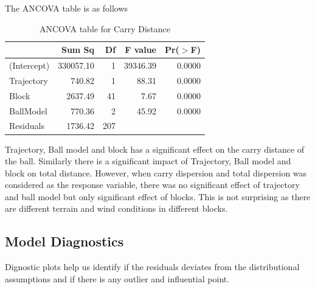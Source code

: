 \documentclass{article}\usepackage[]{graphicx}\usepackage[]{color}
\begin{document}
The ANCOVA table is as follows

\begin{table}[ht]
\centering
\begin{tabular}{|l|rrrr|}
  \hline
 & Sum Sq & Df & F value & Pr($>$F) \\ 
  \hline
(Intercept) & 330057.10 & 1 & 39346.39 & 0.0000 \\ 
  Trajectory & 740.82 & 1 & 88.31 & 0.0000 \\ 
  Block & 2637.49 & 41 & 7.67 & 0.0000 \\ 
  BallModel & 770.36 & 2 & 45.92 & 0.0000 \\ 
  Residuals & 1736.42 & 207 &  &  \\ 
   \hline
\end{tabular}
\caption{ANCOVA table for Carry Distance}
\end{table}

\bigskip

\bigskip

Trajectory, Ball model and block has a significant effect on the carry distance of the ball. Similarly there is a significant impact of Trajectory, Ball model and block on total distance. However, when carry dispersion and total dispersion was considered as the response variable, there was no significant effect of trajectory and ball model but only significant effect of blocks. This is not surprising as there are different terrain and wind conditions in different blocks.

\subsection*{Model Diagnostics}

Dignostic plots help us identify if the residuals deviates from the distributional assumptions and if there is any outlier and influential point.  
\end{document}

